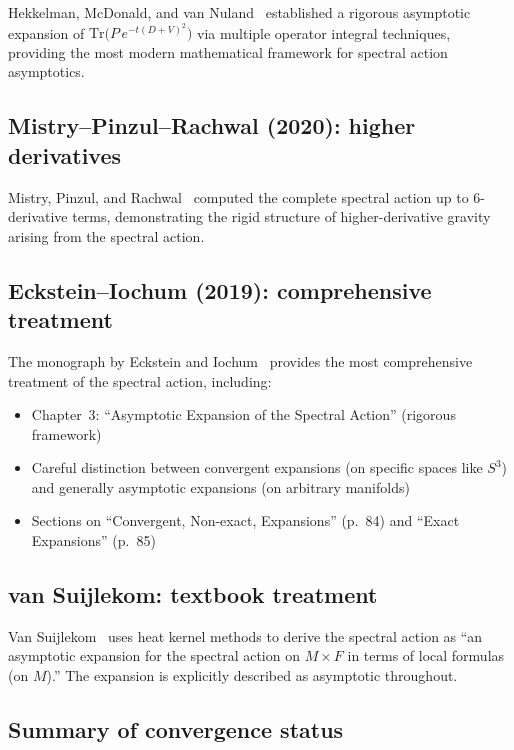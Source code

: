 \documentclass[11pt,a4paper]{article}
\begin{document}
Hekkelman, McDonald, and van Nuland~\cite{HMvN24} established a
rigorous asymptotic expansion of
$\mathrm{Tr}\bigl(P\,e^{-t(D+V)^2}\bigr)$ via multiple operator integral
techniques, providing the most modern mathematical framework for
spectral action asymptotics.

\subsection{Mistry--Pinzul--Rachwal (2020): higher derivatives}

Mistry, Pinzul, and Rachwal~\cite{MPR20} computed the complete spectral
action up to 6-derivative terms, demonstrating the rigid structure of
higher-derivative gravity arising from the spectral action.

\subsection{Eckstein--Iochum (2019): comprehensive treatment}

The monograph by Eckstein and Iochum~\cite{EI19} provides the most
comprehensive treatment of the spectral action, including:

\begin{itemize}
  \item Chapter~3: ``Asymptotic Expansion of the Spectral Action''
    (rigorous framework)
  \item Careful distinction between convergent expansions (on specific
    spaces like $S^3$) and generally asymptotic expansions (on
    arbitrary manifolds)
  \item Sections on ``Convergent, Non-exact, Expansions'' (p.~84)
    and ``Exact Expansions'' (p.~85)
\end{itemize}

\subsection{van Suijlekom: textbook treatment}

Van Suijlekom~\cite{vS15} uses heat kernel methods to derive the
spectral action as ``an asymptotic expansion for the spectral action
on $M \times F$ in terms of local formulas (on $M$).''  The expansion
is explicitly described as asymptotic throughout.

\subsection{Summary of convergence status}
\end{document}
